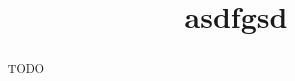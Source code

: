 \documentclass{article}
\title{asdfgsd}
\begin{document}
\maketitle

\begin{abstract}
TODO
\end{abstract}




\end{document}
